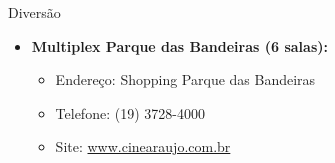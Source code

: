 \begin{story}{Diversão}
\begin{itemize}
\item \textbf{Multiplex Parque das Bandeiras (6 salas):}
\begin{itemize}
\item Endereço: Shopping Parque das Bandeiras
\item Telefone: (19) 3728-4000
\item Site: \url{www.cinearaujo.com.br}
\end{itemize}

\end{itemize}

\end{story}

